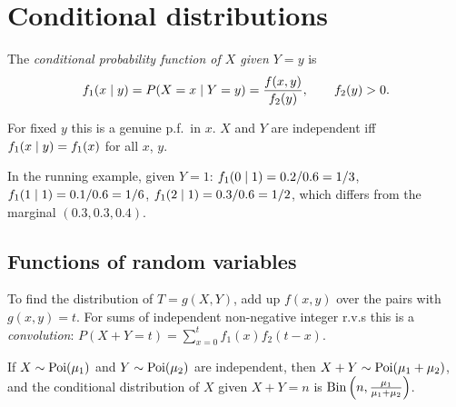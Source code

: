 \section{Conditional distributions}

\begin{definition}[Conditional p.f.]
The \emph{conditional probability function of $X$ given $Y = y$} is
\[
  f_1(x\mid y) = P(X = x\mid Y = y) = \frac{f(x,y)}{f_2(y)}, \qquad f_2(y) > 0.
\]
\end{definition}

For fixed $y$ this is a genuine p.f.\ in $x$. $X$ and $Y$ are independent iff
$f_1(x\mid y) = f_1(x)$ for all $x$, $y$.

\begin{example}
In the running example, given $Y=1$:
$f_1(0\mid1) = 0.2/0.6 = 1/3$, $f_1(1\mid1) = 0.1/0.6 = 1/6$,
$f_1(2\mid1) = 0.3/0.6 = 1/2$, which differs from the marginal $(0.3, 0.3, 0.4)$.
\end{example}

\begin{center}
\end{center}

\subsection{Functions of random variables}

To find the distribution of $T = g(X,Y)$, add up $f(x,y)$ over the pairs with
$g(x,y) = t$. For sums of independent non-negative integer r.v.s this is a
\emph{convolution}: $P(X+Y = t) = \sum_{x=0}^t f_1(x)f_2(t-x)$.

\begin{theorem}
If $X\sim\operatorname{Poi}(\mu_1)$ and $Y\sim\operatorname{Poi}(\mu_2)$ are independent, then
$X+Y\sim\operatorname{Poi}(\mu_1+\mu_2)$, and the conditional distribution of $X$ given $X+Y = n$ is
$\operatorname{Bin}\left(n, \frac{\mu_1}{\mu_1+\mu_2}\right)$.
\end{theorem}

